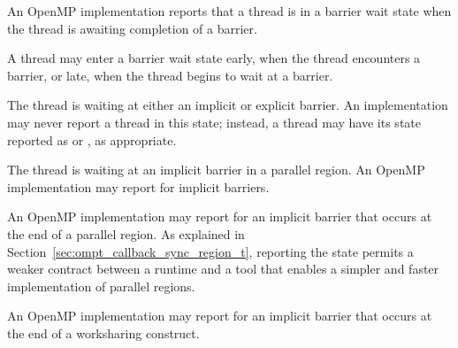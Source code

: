 
An OpenMP implementation reports that a thread is in a barrier wait state
when the thread is awaiting completion of a barrier.

A thread may enter a barrier wait state
early, when the thread encounters a barrier, or late, when the
thread begins to wait at a barrier. 

\begin{description}

  \item {}

  \sloppy
  The thread is waiting at either an implicit or explicit barrier.
  An implementation may never report a thread in this state; instead, a thread may have its state reported
  as   or , as appropriate.

  \item {}

  \sloppy
  The thread is waiting at an implicit barrier in a parallel region.
  An OpenMP implementation may report 
  for implicit barriers.

  \item {}

  An OpenMP implementation may report 
  for an implicit barrier that occurs at the end of a parallel region.
  As explained in Section~\ref{sec:ompt_callback_sync_region_t},
  reporting the state 
  permits a weaker contract between a runtime and a tool that
  enables a simpler and faster implementation of parallel regions.

  \item {}

  An OpenMP implementation may report 
  for an implicit barrier that occurs at the end of a worksharing construct.


\end{description}

